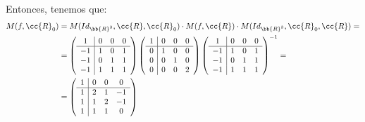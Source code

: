 \begin{ejercicio}
    Entonces, tenemos que:
    \begin{equation*}\begin{split}
        M(f,\cc{R}_0) &= M(Id_{\bb{R}^3}, \cc{R}, \cc{R}_0)\cdot M(f,\cc{R}) \cdot M(Id_{\bb{R}^3}, \cc{R}_0, \cc{R})=\\&
        = \left(
        \begin{array}{c|ccc}
            1 & 0 & 0 & 0 \\ \hline
            -1 & 1 & 0 & 1 \\
            -1 & 0 & 1 & 1 \\
            -1 & 1 & 1 & 1
        \end{array} \right)
        \left(
        \begin{array}{c|ccc}
            1 & 0 & 0 & 0 \\ \hline
            0 & 1 & 0 & 0 \\
            0 & 0 & 1 & 0 \\
            0 & 0 & 0 & 2
        \end{array} \right)
        \left(
        \begin{array}{c|ccc}
            1 & 0 & 0 & 0 \\ \hline
            -1 & 1 & 0 & 1 \\
            -1 & 0 & 1 & 1 \\
            -1 & 1 & 1 & 1
        \end{array} \right)^{-1} =\\&
        = \left(
        \begin{array}{c|ccc}
            1&	0	&0&	 0 \\ \hline
            1&	2&	1&	-1 \\
            1&	1&	2&	-1 \\
            1&	1&	1&	 0 \\
        \end{array} \right)
    \end{split}\end{equation*}
    
\end{ejercicio}

